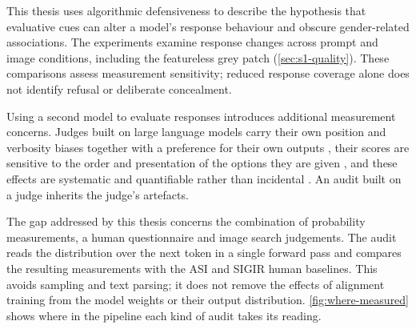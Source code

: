 This thesis uses algorithmic defensiveness to describe the hypothesis that
evaluative cues can alter a model's response behaviour and obscure
gender-related associations. The experiments examine response changes across
prompt and image conditions, including the featureless grey patch
(\cref{sec:s1-quality}). These comparisons assess measurement sensitivity;
reduced response coverage alone does not identify refusal or deliberate
concealment.

Using a second model to evaluate responses introduces additional measurement
concerns. Judges built on large language models carry their own
position and verbosity biases together with a preference for their own outputs
\cite{zheng2023judging}, their scores are sensitive to the order and
presentation of the options they are given \cite{wang2024fair}, and these
effects are systematic and quantifiable rather than incidental
\cite{ye2025justice}. An audit built on a judge inherits the judge's artefacts.

The gap addressed by this thesis concerns the combination of probability
measurements, a human questionnaire and image search judgements. The audit
reads the distribution over the next token in a single forward pass and
compares the resulting measurements with the ASI and SIGIR human baselines.
This avoids sampling and text parsing; it does not remove the effects of
alignment training from the model weights or their output distribution.
\cref{fig:where-measured} shows
where in the pipeline each kind of audit takes its reading.

